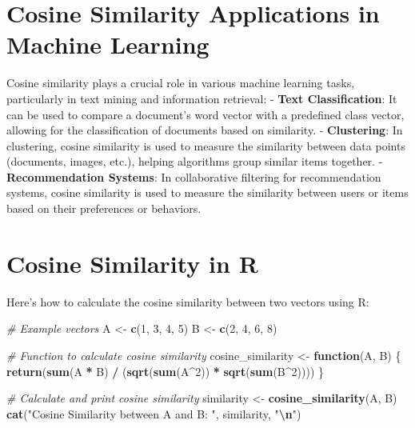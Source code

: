 \documentclass[
  12 pt,
  a4paper,
]{book}
\newenvironment{Shaded}{\begin{snugshade}}{\end{snugshade}}
\newcommand{\CommentTok}[1]{\textcolor[rgb]{0.56,0.35,0.01}{\textit{#1}}}
\newcommand{\ControlFlowTok}[1]{\textcolor[rgb]{0.13,0.29,0.53}{\textbf{#1}}}
\newcommand{\DecValTok}[1]{\textcolor[rgb]{0.00,0.00,0.81}{#1}}
\newcommand{\FunctionTok}[1]{\textcolor[rgb]{0.13,0.29,0.53}{\textbf{#1}}}
\newcommand{\NormalTok}[1]{#1}
\newcommand{\OtherTok}[1]{\textcolor[rgb]{0.56,0.35,0.01}{#1}}
\newcommand{\SpecialCharTok}[1]{\textcolor[rgb]{0.81,0.36,0.00}{\textbf{#1}}}
\newcommand{\StringTok}[1]{\textcolor[rgb]{0.31,0.60,0.02}{#1}}
\numberwithin{equation}{section}
\theoremstyle{plain}      %
\theoremstyle{definition} %
\theoremstyle{remark}     %
\theoremstyle{note}         %
\begin{document}
\hypertarget{cosine-similarity-applications-in-machine-learning}{%
\section{Cosine Similarity Applications in Machine
Learning}\label{cosine-similarity-applications-in-machine-learning}}

Cosine similarity plays a crucial role in various machine learning
tasks, particularly in text mining and information retrieval: -
\textbf{Text Classification}: It can be used to compare a document's
word vector with a predefined class vector, allowing for the
classification of documents based on similarity. - \textbf{Clustering}:
In clustering, cosine similarity is used to measure the similarity
between data points (documents, images, etc.), helping algorithms group
similar items together. - \textbf{Recommendation Systems}: In
collaborative filtering for recommendation systems, cosine similarity is
used to measure the similarity between users or items based on their
preferences or behaviors.

\hypertarget{cosine-similarity-in-r}{%
\section{Cosine Similarity in R}\label{cosine-similarity-in-r}}

Here's how to calculate the cosine similarity between two vectors using
R:

\scriptsize

\begin{Shaded}
\begin{Highlighting}[]
\CommentTok{\# Example vectors}
\NormalTok{A }\OtherTok{\textless{}{-}} \FunctionTok{c}\NormalTok{(}\DecValTok{1}\NormalTok{, }\DecValTok{3}\NormalTok{, }\DecValTok{4}\NormalTok{, }\DecValTok{5}\NormalTok{)}
\NormalTok{B }\OtherTok{\textless{}{-}} \FunctionTok{c}\NormalTok{(}\DecValTok{2}\NormalTok{, }\DecValTok{4}\NormalTok{, }\DecValTok{6}\NormalTok{, }\DecValTok{8}\NormalTok{)}

\CommentTok{\# Function to calculate cosine similarity}
\NormalTok{cosine\_similarity }\OtherTok{\textless{}{-}} \ControlFlowTok{function}\NormalTok{(A, B) \{}
  \FunctionTok{return}\NormalTok{(}\FunctionTok{sum}\NormalTok{(A }\SpecialCharTok{*}\NormalTok{ B) }\SpecialCharTok{/}\NormalTok{ (}\FunctionTok{sqrt}\NormalTok{(}\FunctionTok{sum}\NormalTok{(A}\SpecialCharTok{\^{}}\DecValTok{2}\NormalTok{)) }\SpecialCharTok{*} \FunctionTok{sqrt}\NormalTok{(}\FunctionTok{sum}\NormalTok{(B}\SpecialCharTok{\^{}}\DecValTok{2}\NormalTok{))))}
\NormalTok{\}}

\CommentTok{\# Calculate and print cosine similarity}
\NormalTok{similarity }\OtherTok{\textless{}{-}} \FunctionTok{cosine\_similarity}\NormalTok{(A, B)}
\FunctionTok{cat}\NormalTok{(}\StringTok{"Cosine Similarity between A and B: "}\NormalTok{, similarity, }\StringTok{"}\SpecialCharTok{\textbackslash{}n}\StringTok{"}\NormalTok{)}
\end{Highlighting}
\end{Shaded}
\end{document}

